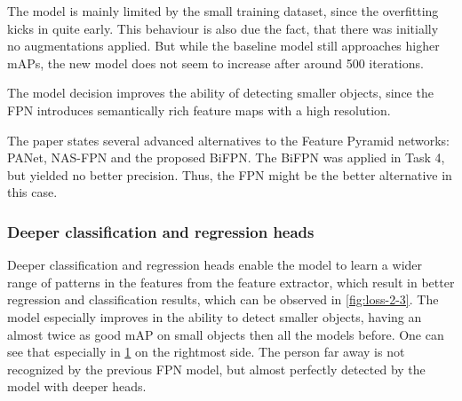 \documentclass{article}
\begin{document}
The model is mainly limited by the small training dataset, since the overfitting kicks in quite early. This behaviour is also due the fact, that there was initially no augmentations applied. But while the baseline model still approaches higher mAPs, the new model does not seem to increase after around 500 iterations.

The model decision improves the ability of detecting smaller objects, since the FPN introduces semantically rich feature maps with a high resolution.

The paper \cite{efficientdet} states several advanced alternatives to the Feature Pyramid networks: PANet, NAS-FPN and the proposed BiFPN. The BiFPN was applied in Task 4, but yielded no better precision. Thus, the FPN might be the better alternative in this case.

\subsubsection*{Deeper classification and regression heads}

Deeper classification and regression heads enable the model to learn a wider range of patterns in the features from the feature extractor, which result in better regression and classification results, which can be observed in \ref{fig:loss-2-3}. The model especially improves in the ability to detect smaller objects, having an almost twice as good mAP on small objects then all the models before. One can see that especially in \ref{fig:comparison2} on the rightmost side. The person far away is not recognized by the previous FPN model, but almost perfectly detected by the model with deeper heads.

\begin{figure}[t!]
    \centering
    \label{fig:comparison2}
\end{figure}
\end{document}
